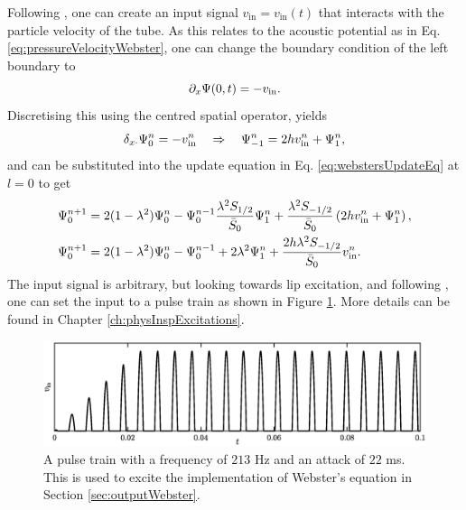 Following \cite{Bilbao2018}, one can create an input signal $v_\text{in} = v_\text{in}(t)$ that interacts with the particle velocity of the tube. As this relates to the acoustic potential as in Eq. \eqref{eq:pressureVelocityWebster}, one can change the boundary condition of the left boundary to
\begin{equation}
    \partial_x \Psi(0, t) = - v_\text{in}.
\end{equation}
Discretising this using the centred spatial operator, yields
\begin{equation}
    \delta_{x\cdot} \Psi_0^n = -v_\text{in}^n \quad \Rightarrow \quad \Psi_{-1}^n = 2h v_\text{in}^n + \Psi_1^n,
\end{equation}
and can be substituted into the update equation in Eq. \eqref{eq:webstersUpdateEq} at $l=0$ to get
\begin{align}
    \Psi_0^{n+1} &= 2(1-\lambda^2)\Psi_0^n-\Psi_0^{n-1} \frac{\lambda^2S_{1/2}}{\bar{S}_0}\Psi_1^n + \frac{\lambda^2S_{-1/2}}{\bar{S}_0}\left(2h v_\text{in}^n + \Psi_1^n\right),\nonumber\\
    \Psi_0^{n+1} &= 2(1-\lambda^2)\Psi_0^n-\Psi_0^{n-1} +2\lambda^2\Psi_1^n + \frac{2h\lambda^2S_{-1/2}}{\bar{S}_0} v_\text{in}^n.
\end{align}
The input signal is arbitrary, but looking towards lip excitation, and following \cite{theBible}, one can set the input to a pulse train as shown in Figure \ref{fig:inputWebster}. More details can be found in Chapter \ref{ch:physInspExcitations}.
\begin{figure}[h]
    \centering
    \includegraphics[width=\textwidth]{figures/resonators/brass/inputWebster.eps}
    \caption{A pulse train with a frequency of $213$ Hz and an attack of $22$ ms. This is used to excite the implementation of Webster's equation in Section \ref{sec:outputWebster}. \label{fig:inputWebster}}
\end{figure}





